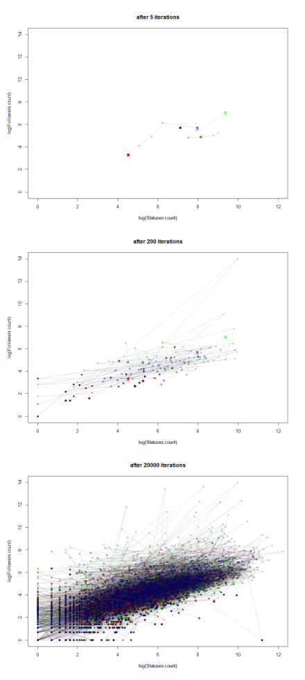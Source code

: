\begin{figure}[htb]
      \includegraphics[width=\linewidth]{figs/2dconv_5iters.png}
\caption{}\label{fig:con1}
    \endminipage\hfill
    \includegraphics[width=\linewidth]{figs/2dconv_200iters.png}
\caption{}\label{fig:con2}
    \endminipage
    \includegraphics[width=\linewidth]{figs/2dconv_20000iters.png}

\end{figure}
